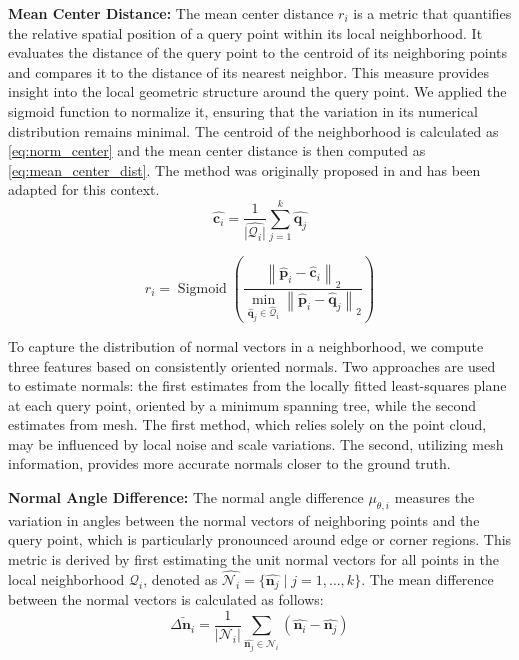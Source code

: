 \documentclass[lettersize,journal]{IEEEtran}
\begin{document}
\textbf{Mean Center Distance:} The mean center distance $r_i$ is a metric that quantifies the relative spatial position of a query point within its local neighborhood. It evaluates the distance of the query point to the centroid of its neighboring points and compares it to the distance of its nearest neighbor. This measure provides insight into the local geometric structure around the query point. We applied the sigmoid function to normalize it, ensuring that the variation in its numerical distribution remains minimal. The centroid of the neighborhood is calculated as \cref{eq:norm_center} and the mean center distance is then computed as \cref{eq:mean_center_dist}. The method was originally proposed in \cite{ahmed_edge_2018} and has been adapted for this context.
\begin{equation}
    \hat{\mathbf{c}_i} = \frac{1}{\hat{|\mathcal{Q}_i|}} \sum_{j=1}^{k} \hat{\mathbf{q}_j}
    \label{eq:norm_center}
\end{equation}

\begin{equation}
    r_i=\operatorname{Sigmoid}\left(\frac{\left\|\hat{\mathbf{p}}_{i}-\hat{\mathbf{c}}_{i}\right\|_{2}}{\min _{\hat{\mathbf{q}}_{j} \in \hat{\mathcal{Q}}_{i}}\left\|\hat{\mathbf{p}}_{i}-\hat{\mathbf{q}}_{j}\right\|_{2}}\right)
    \label{eq:mean_center_dist}
\end{equation}


To capture the distribution of normal vectors in a neighborhood, we compute three features based on consistently oriented normals. Two approaches are used to estimate normals: the first estimates from the locally fitted least-squares plane at each query point, oriented by a minimum spanning tree, while the second estimates from mesh. The first method, which relies solely on the point cloud, may be influenced by local noise and scale variations. The second, utilizing mesh information, provides more accurate normals closer to the ground truth.

\textbf{Normal Angle Difference:} The normal angle difference $\mu_{\theta,i}$ measures the variation in angles between the normal vectors of neighboring points and the query point, which is particularly pronounced around edge or corner regions. This metric is derived by first estimating the unit normal vectors for all points in the local neighborhood \( \mathcal{Q}_i \), denoted as \(\hat{\mathcal{N}_i} = \{\hat{\mathbf{n}_j} \mid j = 1, \dots, k\} \). The mean difference between the normal vectors is calculated as follows:
\begin{equation}
    \bar{\Delta \mathbf{n}_i} = \frac{1}{|\mathcal{N}_i|} \sum_{\hat{\mathbf{n}_j} \in \mathcal{N}_i} ( \hat{\mathbf{n}_i} - \hat{\mathbf{n}_j} )
    \label{eq:normal_vector_difference}
\end{equation}
\end{document}
